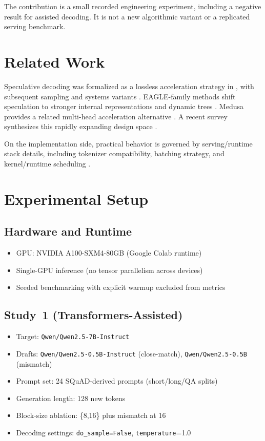 \documentclass[11pt]{article}
\begin{document}
The contribution is a small recorded engineering experiment, including a negative result for assisted decoding. It is not a new algorithmic variant or a replicated serving benchmark.

\section{Related Work}
Speculative decoding was formalized as a lossless acceleration strategy in \cite{leviathan2023fast}, with subsequent sampling and systems variants \cite{chen2023speculative,mamou2024dynamic}. EAGLE-family methods shift speculation to stronger internal representations and dynamic trees \cite{li2024eagle,li2024eagle2,li2025eagle3}. Medusa provides a related multi-head acceleration alternative \cite{cai2024medusa}. A recent survey synthesizes this rapidly expanding design space \cite{xia2024survey}.

On the implementation side, practical behavior is governed by serving/runtime stack details, including tokenizer compatibility, batching strategy, and kernel/runtime scheduling \cite{hf_assisted_docs,hf_uag_blog,vllm_spec_docs,redhat_eagle3_modelcard}.

\section{Experimental Setup}
\subsection{Hardware and Runtime}
\begin{itemize}[leftmargin=1.2em]
    \item GPU: NVIDIA A100-SXM4-80GB (Google Colab runtime)
    \item Single-GPU inference (no tensor parallelism across devices)
    \item Seeded benchmarking with explicit warmup excluded from metrics
\end{itemize}

\subsection{Study~1 (Transformers-Assisted)}
\begin{itemize}[leftmargin=1.2em]
    \item Target: \texttt{Qwen/Qwen2.5-7B-Instruct}
    \item Drafts: \texttt{Qwen/Qwen2.5-0.5B-Instruct} (close-match), \texttt{Qwen/Qwen2.5-0.5B} (mismatch)
    \item Prompt set: 24 SQuAD-derived prompts (short/long/QA splits)
    \item Generation length: 128 new tokens
    \item Block-size ablation: \{8,16\} plus mismatch at 16
    \item Decoding settings: \texttt{do\_sample=False}, \texttt{temperature}=1.0
\end{itemize}
\end{document}
